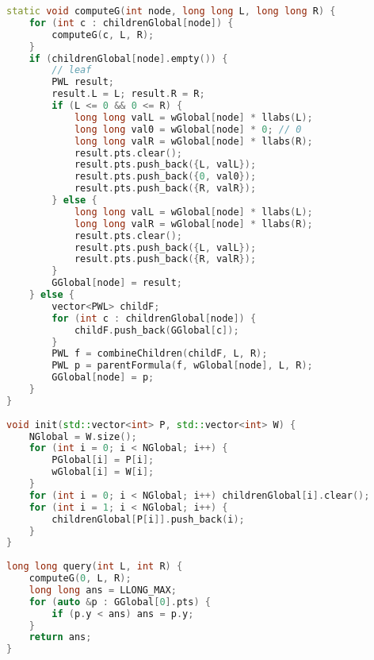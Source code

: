 \begin{lstlisting}[language=C++]
static void computeG(int node, long long L, long long R) {
    for (int c : childrenGlobal[node]) {
        computeG(c, L, R);
    }
    if (childrenGlobal[node].empty()) {
        // leaf
        PWL result;
        result.L = L; result.R = R;
        if (L <= 0 && 0 <= R) {
            long long valL = wGlobal[node] * llabs(L);
            long long val0 = wGlobal[node] * 0; // 0
            long long valR = wGlobal[node] * llabs(R);
            result.pts.clear();
            result.pts.push_back({L, valL});
            result.pts.push_back({0, val0});
            result.pts.push_back({R, valR});
        } else {
            long long valL = wGlobal[node] * llabs(L);
            long long valR = wGlobal[node] * llabs(R);
            result.pts.clear();
            result.pts.push_back({L, valL});
            result.pts.push_back({R, valR});
        }
        GGlobal[node] = result;
    } else {
        vector<PWL> childF;
        for (int c : childrenGlobal[node]) {
            childF.push_back(GGlobal[c]);
        }
        PWL f = combineChildren(childF, L, R);
        PWL p = parentFormula(f, wGlobal[node], L, R);
        GGlobal[node] = p;
    }
}
 
void init(std::vector<int> P, std::vector<int> W) {
    NGlobal = W.size();
    for (int i = 0; i < NGlobal; i++) {
        PGlobal[i] = P[i];
        wGlobal[i] = W[i];
    }
    for (int i = 0; i < NGlobal; i++) childrenGlobal[i].clear();
    for (int i = 1; i < NGlobal; i++) {
        childrenGlobal[P[i]].push_back(i);
    }
}
 
long long query(int L, int R) {
    computeG(0, L, R);
    long long ans = LLONG_MAX;
    for (auto &p : GGlobal[0].pts) {
        if (p.y < ans) ans = p.y;
    }
    return ans;
}
\end{lstlisting}
